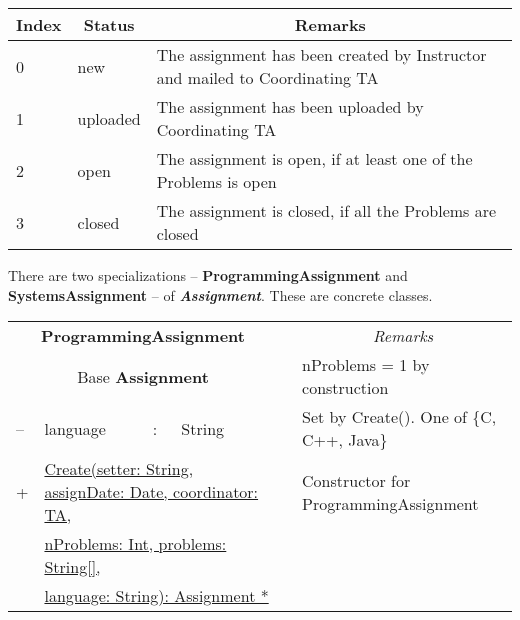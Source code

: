 \documentclass{article}
\begin{document}
\begin{enumerate}
\begin{center}
\begin{scriptsize}
\begin{tabular}{|l|l|l|} \hline
\multicolumn{1}{|c}{\bf Index} & \multicolumn{1}{|c}{\bf Status} & \multicolumn{1}{|c|}{\bf Remarks} \\ \hline
0 & new 		& The assignment has been created by Instructor and mailed to Coordinating TA \\
1 & uploaded 	& The assignment has been uploaded by Coordinating TA \\
2 & open 		& The assignment is open, if at least one of the Problems is open \\
3 & closed 		& The assignment is closed, if all the Problems are closed \\ \hline
\end{tabular}
\end{scriptsize}
\end{center}

There are two specializations -- {\bf ProgrammingAssignment} and {\bf SystemsAssignment} -- of {\bf \em Assignment}. These are concrete classes. 

\begin{center}
\begin{scriptsize}
\begin{tabular}{|lllll|l|p{7cm}|} \cline{1-5} \cline{7-7}
\multicolumn{5}{|c|}{\bf \textsf{ProgrammingAssignment}} 	& & \multicolumn{1}{|c|}{\em Remarks}\\ \cline{1-5} \cline{7-7}
\multicolumn{5}{|c|}{Base {\bf \textsf{Assignment}}} 		& & \textsf{nProblems} = 1 by construction \\ \cline{1-5} \cline{7-7}
-- & \textsf{language} 		& : & String				& & & Set by Create(). One of \{C, C++, Java\} \\ 
\cline{1-5} \cline{7-7}
 + & \multicolumn{4}{l|}{\underline{Create(setter: String, assignDate: Date, coordinator: TA,}} & & Constructor for ProgrammingAssignment \\ 
   & \multicolumn{4}{l|}{\quad \quad \underline{nProblems: Int, problems: String[], }} & &  \\
   & \multicolumn{4}{l|}{\quad \quad \underline{language: String): Assignment *}} & &  \\
 \cline{1-5} \cline{7-7}
\end{tabular}
\end{scriptsize}
\end{center}


\end{enumerate}
\end{document}
